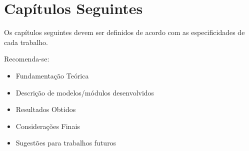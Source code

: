 \chapter{Capítulos Seguintes}
\label{cap:modelagem}

Os capítulos seguintes devem ser definidos de acordo com as especificidades de cada trabalho.

Recomenda-se:

\begin{itemize}
	\item Fundamentação Teórica
	\item Descrição de modelos/módulos desenvolvidos
	\item Resultados Obtidos
	\item Considerações Finais
	\item Sugestões para trabalhos futuros
\end{itemize}


